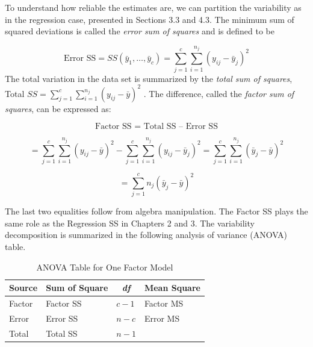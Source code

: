 To understand how reliable the estimates are, we can partition the
variability as in the regression case, presented in Sections 3.3 and 4.3.
The minimum sum of squared deviations is called the \textit{error sum of
squares} and is defined to be

\begin{equation*}
\text{Error SS}=SS(\bar{y}_1,\ldots ,\bar{y}_{c})=\sum_{j=1}^{c}%
\sum_{i=1}^{n_{j}}(y_{ij}-\bar{y}_{j})^{2}
\end{equation*}%
The total variation in the data set is summarized by the \textit{total sum
of squares}, Total $SS=\sum_{j=1}^{c}\sum_{i=1}^{n_{j}}(y_{ij}-\bar{y})^{2}$%
. The difference, called the \textit{factor sum of} \textit{squares}, can be
expressed as:

\begin{equation*}
\text{Factor SS = Total SS -- Error SS}
\end{equation*}

\begin{equation*}
=\sum_{j=1}^{c}\sum_{i=1}^{n_{j}}(y_{ij}-\bar{y})^{2}-\sum_{j=1}^{c}%
\sum_{i=1}^{n_{j}}(y_{ij}-\bar{y}_{j})^{2}=\sum_{j=1}^{c}\sum_{i=1}^{n_{j}}(%
\bar{y}_{j}-\bar{y})^{2}
\end{equation*}

\begin{equation*}
=\sum_{j=1}^{c}n_{j}(\bar{y}_{j}-\bar{y})^{2}
\end{equation*}

The last two equalities follow from algebra manipulation. The Factor
SS plays the same role as the Regression SS in Chapters 2 and 3. The
variability decomposition is summarized in the following analysis of
variance (ANOVA) table.

  \begin{center}  \begin{table}[h]
\caption{\label{T4:ANOVAOneFactor} ANOVA Table for One Factor Model}
\begin{tabular}{cccc}
\hline
Source & Sum of Square & \textit{df} & Mean Square \\ \hline
\multicolumn{1}{l}{Factor} & \multicolumn{1}{l}{Factor SS} &
\multicolumn{1}{l}{$c-1$} & \multicolumn{1}{l}{Factor MS} \\
\multicolumn{1}{l}{Error} & \multicolumn{1}{l}{Error SS} &
\multicolumn{1}{l}{$n-c$} & \multicolumn{1}{l}{Error MS} \\
\multicolumn{1}{l}{Total} & \multicolumn{1}{l}{Total SS} &
\multicolumn{1}{l}{$n-1$} & \multicolumn{1}{l}{} \\ \hline
\end{tabular}

\end{table}  \end{center}  

